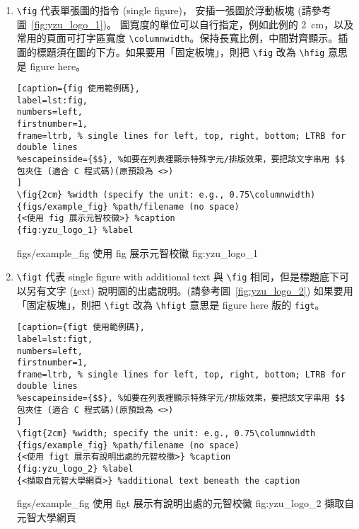 \begin{enumerate}
\item \verb+\fig+ 代表單張圖的指令 (single figure)， 安插一張圖於浮動板塊 (請參考圖~\ref{fig:yzu_logo_1})。
圖寬度的單位可以自行指定，例如此例的 2~cm，以及常用的頁面可打字區寬度 \verb+\columnwidth+。保持長寬比例，中間對齊顯示。插圖的標題須在圖的下方。如果要用「固定板塊」，則把 \verb+\fig+ 改為 \verb+\hfig+ 意思是 figure here。

{\centering\begin{lstlisting}[caption={fig 使用範例碼},
label=lst:fig,
numbers=left,
firstnumber=1,
frame=ltrb, % single lines for left, top, right, bottom; LTRB for double lines 
%escapeinside={$$}, %如要在列表裡顯示特殊字元/排版效果，要把該文字串用 $$ 包夾住 (適合 C 程式碼)(原預設為 <>)
]
\fig{2cm} %width (specify the unit: e.g., 0.75\columnwidth)
{figs/example_fig} %path/filename (no space)
{<使用 fig 展示元智校徽>} %caption
{fig:yzu_logo_1} %label
\end{lstlisting}\par}

% 
%
%
\fig{2cm} %
{figs/example_fig} %
{使用 fig 展示元智校徽} %
{fig:yzu_logo_1} %
%

\item \verb+\figt+ 代表 single figure with additional text 與 \verb+\fig+ 相同，但是標題底下可以另有文字 (\uline{t}ext) 說明圖的出處說明。(請參考圖~\ref{fig:yzu_logo_2}) 如果要用「固定板塊」，則把 \verb+\figt+ 改為 \verb+\hfigt+ 意思是 figure here 版的 \verb+figt+。

{\centering\begin{lstlisting}[caption={figt 使用範例碼},
label=lst:figt,
numbers=left,
firstnumber=1,
frame=ltrb, % single lines for left, top, right, bottom; LTRB for double lines 
%escapeinside={$$}, %如要在列表裡顯示特殊字元/排版效果，要把該文字串用 $$ 包夾住 (適合 C 程式碼)(原預設為 <>)
]
\figt{2cm} %width; specify the unit: e.g., 0.75\columnwidth
{figs/example_fig} %path/filename (no space)
{<使用 figt 展示有說明出處的元智校徽>} %caption
{fig:yzu_logo_2} %label
{<擷取自元智大學網頁>} %additional text beneath the caption
\end{lstlisting}\par}

%
\figt{2cm} %
{figs/example_fig} %
{使用 figt 展示有說明出處的元智校徽} %
{fig:yzu_logo_2} %
{擷取自元智大學網頁} %
%


\end{enumerate}
